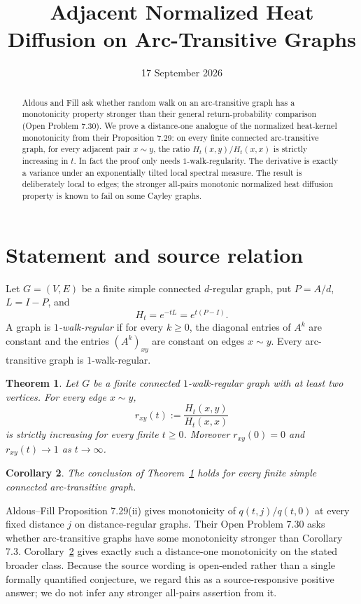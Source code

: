 \documentclass[11pt]{article}
\title{Adjacent Normalized Heat Diffusion on Arc-Transitive Graphs}
\author{}
\date{17 September 2026}
\newtheorem{theorem}{Theorem}
\newtheorem{corollary}[theorem]{Corollary}
\begin{document}
\maketitle

\begin{abstract}
Aldous and Fill ask whether random walk on an arc-transitive graph has a monotonicity property stronger than their general return-probability comparison (Open Problem 7.30). We prove a distance-one analogue of the normalized heat-kernel monotonicity from their Proposition 7.29: on every finite connected arc-transitive graph, for every adjacent pair $x\sim y$, the ratio $H_t(x,y)/H_t(x,x)$ is strictly increasing in $t$. In fact the proof only needs $1$-walk-regularity. The derivative is exactly a variance under an exponentially tilted local spectral measure. The result is deliberately local to edges; the stronger all-pairs monotonic normalized heat diffusion property is known to fail on some Cayley graphs.
\end{abstract}

\section{Statement and source relation}
Let $G=(V,E)$ be a finite simple connected $d$-regular graph, put $P=A/d$, $L=I-P$, and
\[
H_t=e^{-tL}=e^{t(P-I)}.
\]
A graph is \emph{$1$-walk-regular} if for every $k\ge0$, the diagonal entries of $A^k$ are constant and the entries $(A^k)_{xy}$ are constant on edges $x\sim y$. Every arc-transitive graph is $1$-walk-regular.

\begin{theorem}\label{thm:main}
Let $G$ be a finite connected $1$-walk-regular graph with at least two vertices. For every edge $x\sim y$,
\[
r_{xy}(t):=\frac{H_t(x,y)}{H_t(x,x)}
\]
is strictly increasing for every finite $t\ge0$. Moreover $r_{xy}(0)=0$ and $r_{xy}(t)\to1$ as $t\to\infty$.
\end{theorem}

\begin{corollary}\label{cor:arc}
The conclusion of Theorem~\ref{thm:main} holds for every finite simple connected arc-transitive graph.
\end{corollary}

Aldous--Fill Proposition 7.29(ii) gives monotonicity of $q(t,j)/q(t,0)$ at every fixed distance $j$ on distance-regular graphs. Their Open Problem 7.30 asks whether arc-transitive graphs have some monotonicity stronger than Corollary 7.3. Corollary~\ref{cor:arc} gives exactly such a distance-one monotonicity on the stated broader class. Because the source wording is open-ended rather than a single formally quantified conjecture, we regard this as a source-responsive positive answer; we do not infer any stronger all-pairs assertion from it.
\end{document}
